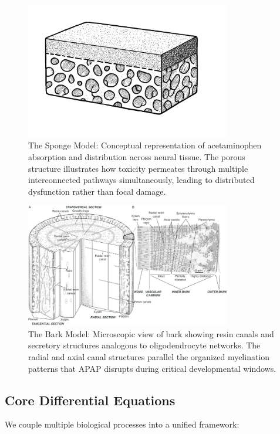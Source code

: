 \documentclass[12pt]{article}
\begin{document}
\begin{figure}[h]
\centering
\includegraphics[width=0.8\textwidth]{../assets/SpongeModel.jpg}
\caption{The Sponge Model: Conceptual representation of acetaminophen absorption and distribution across neural tissue. The porous structure illustrates how toxicity permeates through multiple interconnected pathways simultaneously, leading to distributed dysfunction rather than focal damage.}
\label{fig:spongemodel}
\end{figure}

\begin{figure}[h]
\centering
\includegraphics[width=0.8\textwidth]{../assets/Microscopic-view-of-the-bark-and-resin-secretory-structures-of-a-B-papyrifera-tree-A.png}
\caption{The Bark Model: Microscopic view of bark showing resin canals and secretory structures analogous to oligodendrocyte networks. The radial and axial canal structures parallel the organized myelination patterns that APAP disrupts during critical developmental windows.}
\label{fig:microscopic}
\end{figure}

\subsection{Core Differential Equations}
We couple multiple biological processes into a unified framework:
\end{document}
